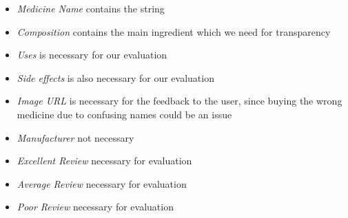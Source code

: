 \documentclass{article}
\begin{document}
\begin{itemize}
    \item \textit{Medicine Name} contains the string
    \item \textit{Composition} contains the main ingredient which we need for transparency
    \item \textit{Uses} is necessary for our evaluation
    \item \textit{Side effects} is also necessary for our evaluation
    \item \textit{Image URL} is necessary for the feedback to the user, since buying the wrong medicine due to confusing names could be an issue
    \item \textit{Manufacturer} not necessary
    \item \textit{Excellent Review} necessary for evaluation
    \item \textit{Average Review} necessary for evaluation
    \item \textit{Poor Review} necessary for evaluation
\end{itemize}
\end{document}
